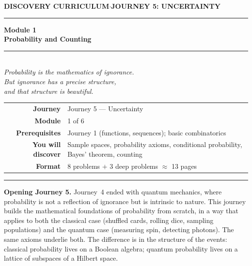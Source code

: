 \documentclass[12pt, a4paper]{article}
\newcounter{problem}
\begin{document}
\thispagestyle{empty}
\begin{center}
{\small\color{MidBlue}\textbf{DISCOVERY CURRICULUM}\quad$\cdot$\quad\textbf{JOURNEY 5: UNCERTAINTY}}
\vspace{0.6cm}

{\color{NavyBlue}\rule{\linewidth}{2pt}}\vspace{0.5cm}

{\Huge\bfseries\color{NavyBlue}Module 1}\\[0.3cm]
{\LARGE\bfseries\color{MidBlue}Probability and Counting}\\[0.4cm]
{\color{Gold}\rule{0.4\linewidth}{1.2pt}}\\[0.4cm]
{\large\itshape\color{DarkGrey}
Probability is the mathematics of ignorance.\\[0.15cm]
But ignorance has a precise structure,\\[0.15cm]
and that structure is beautiful.}

\vspace{1cm}
\begin{tabular}{rl}
\color{DarkGrey}\textbf{Journey}           & Journey 5 --- Uncertainty \\[4pt]
\color{DarkGrey}\textbf{Module}            & 1 of 6 \\[4pt]
\color{DarkGrey}\textbf{Prerequisites}     & Journey 1 (functions, sequences); basic combinatorics \\[4pt]
\color{DarkGrey}\textbf{You will discover} & Sample spaces, probability axioms, conditional probability, Bayes' theorem, counting \\[4pt]
\color{DarkGrey}\textbf{Format}            & 8 problems $+$ 3 deep problems $\approx$ 13 pages \\
\end{tabular}
\vspace{1cm}

{\color{NavyBlue}\rule{\linewidth}{2pt}}
\end{center}

\vspace{0.5cm}
\noindent\textbf{Opening Journey 5.}
Journey~4 ended with quantum mechanics, where probability is not a reflection of ignorance but is intrinsic to nature. This journey builds the mathematical foundations of probability from scratch, in a way that applies to both the classical case (shuffled cards, rolling dice, sampling populations) and the quantum case (measuring spin, detecting photons). The same axioms underlie both. The difference is in the structure of the events: classical probability lives on a Boolean algebra; quantum probability lives on a lattice of subspaces of a Hilbert space.
\end{document}
